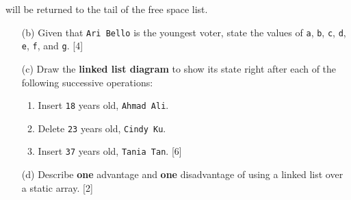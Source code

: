will be returned to the tail of the free space list. 
\begin{enumerate}
\item[(b)]  Given that \texttt{Ari Bello} is the youngest voter, state the values
of \texttt{a}, \texttt{b}, \texttt{c}, \texttt{d}, \texttt{e}, \texttt{f},
and \texttt{g}. \hfill{}{[}4{]}
\item[(c)]  Draw the \textbf{linked list diagram} to show its state right after
each of the following successive operations: 
\begin{enumerate}
\item Insert \texttt{18} years old, \texttt{Ahmad Ali}. 
\item Delete \texttt{23} years old, \texttt{Cindy Ku}. 
\item Insert \texttt{37} years old, \texttt{Tania Tan}. \hfill{}{[}6{]}
\end{enumerate}
\item[(d)]  Describe \textbf{one} advantage and \textbf{one} disadvantage of
using a linked list over a static array. \hfill{}{[}2{]}
\end{enumerate}